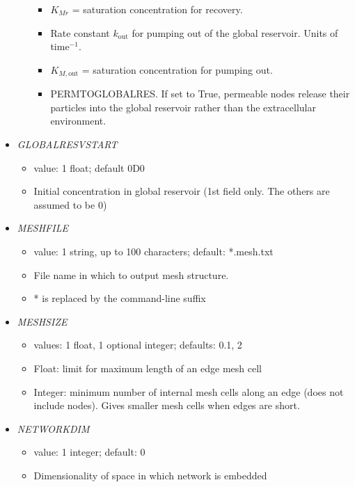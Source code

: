 \documentclass[12pt]{article}
\begin{document}
\begin{itemize}
\begin{itemize}
\begin{itemize}
		\item $K_{Mr}$ = saturation concentration for recovery. 
		\item Rate constant $k_\text{out}$ for pumping out of the global reservoir. Units of time$^{-1}$.
		\item $K_{M,\text{out}}$ = saturation concentration for pumping out.
		\item PERMTOGLOBALRES. If set to True, permeable nodes release their particles into the global reservoir rather than the extracellular environment.
	\end{itemize}
\end{itemize}
%
\item {\it GLOBALRESVSTART}
\begin{itemize}
	\item  value: 1 float; default 0D0
	\item Initial concentration in global reservoir (1st field only. The others are assumed to be 0)
\end{itemize}
%
\item {\it MESHFILE}
\begin{itemize}
	\item  value: 1 string, up to 100 characters; default: *.mesh.txt
	\item File name in which to output mesh structure.
	\item * is replaced by the command-line suffix
\end{itemize}
%
\item {\it MESHSIZE}
\begin{itemize}
	\item  values: 1 float, 1 optional integer; defaults: 0.1, 2
	\item Float: limit for maximum length of an edge mesh cell
	\item Integer: minimum number of internal mesh cells along an edge (does not include nodes). Gives smaller mesh cells when edges are short.
\end{itemize}
%
\item {\it NETWORKDIM}
	\begin{itemize}
		\item  value: 1 integer; default: 0
		\item Dimensionality of space in which network is embedded

\end{itemize}
\end{itemize}
\end{document}
